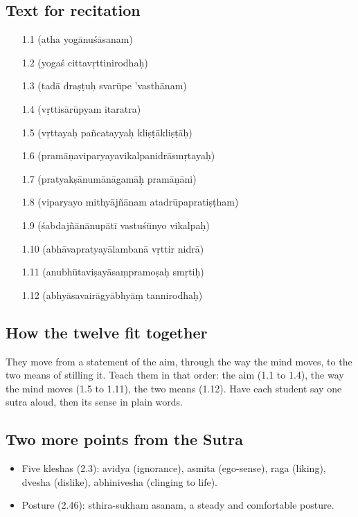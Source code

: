 \subsection*{Text for recitation}
\begin{itemize}
\item[1.1]  (atha yogānuśāsanam)
\item[1.2]  (yogaś cittavṛttinirodhaḥ)
\item[1.3]  (tadā draṣṭuḥ svarūpe 'vasthānam)
\item[1.4]  (vṛttisārūpyam itaratra)
\item[1.5]  (vṛttayaḥ pañcatayyaḥ kliṣṭākliṣṭāḥ)
\item[1.6]  (pramāṇaviparyayavikalpanidrāsmṛtayaḥ)
\item[1.7]  (pratyakṣānumānāgamāḥ pramāṇāni)
\item[1.8]  (viparyayo mithyājñānam atadrūpapratiṣṭham)
\item[1.9]  (śabdajñānānupātī vastuśūnyo vikalpaḥ)
\item[1.10]  (abhāvapratyayālambanā vṛttir nidrā)
\item[1.11]  (anubhūtaviṣayāsaṃpramoṣaḥ smṛtiḥ)
\item[1.12]  (abhyāsavairāgyābhyāṃ tannirodhaḥ)
\end{itemize}

\subsection*{How the twelve fit together}
They move from a statement of the aim, through the way the mind moves, to the two means of stilling it. Teach them in that order: the aim (1.1 to 1.4), the way the mind moves (1.5 to 1.11), the two means (1.12). Have each student say one sutra aloud, then its sense in plain words.

\subsection*{Two more points from the Sutra}
\begin{itemize}
\item Five kleshas (2.3): avidya (ignorance), asmita (ego-sense), raga (liking), dvesha (dislike), abhinivesha (clinging to life).
\item Posture (2.46): sthira-sukham asanam, a steady and comfortable posture.
\end{itemize}

